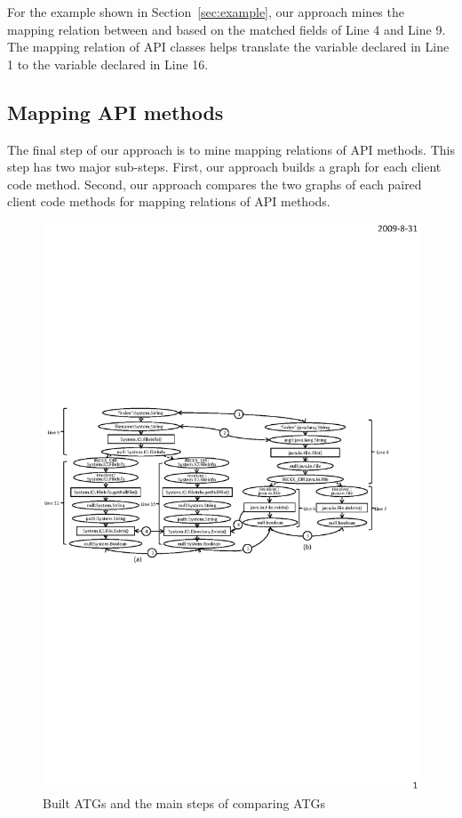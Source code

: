 For the example shown in Section~\ref{sec:example}, our approach
mines the mapping relation between  and
 based on the matched fields of Line 4
and Line 9. The mapping relation of API classes helps translate the
variable declared in Line 1 to the variable declared in Line 16.

\subsection{Mapping API methods}
\label{sec:approach:mappingtypes} The final step of our approach is
to mine mapping relations of API methods. This step has two major
sub-steps. First, our approach builds a graph for each client code
method. Second, our approach compares the two graphs of each paired
client code methods for mapping relations of API methods.

\begin{figure}[t]
\centering
\includegraphics[scale=1.1,clip]{figure/graph.eps}\vspace*{-3ex}
 \caption
{\label{fig:graph}Built ATGs and the main steps of comparing
ATGs}\vspace*{-3.5ex}
\end{figure}

